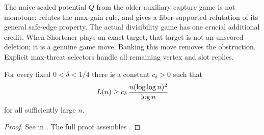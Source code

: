 The naive scaled potential $Q$ from the older auxiliary capture game is not
monotone:  refutes the max-gain rule, and
 gives a fiber-supported refutation of its
general safe-edge property.  The actual divisibility game has one crucial
additional credit.  When Shortener plays an exact target, that target is not
an unscored deletion; it is a genuine game move.  Banking this move removes
the obstruction.  Explicit max-threat selectors handle all remaining vertex
and slot replies.

\begin{theorem}\label{thm:t2}
For every fixed $0<\delta<1/4$ there is a
constant $c_\delta>0$ such that
\[
  L(n)\ge c_\delta\,\frac{n(\log\log n)^2}{\log n}
\]
for all sufficiently large $n$.
\end{theorem}

\begin{proof}
See  in .  The full proof
assembles .
\end{proof}

